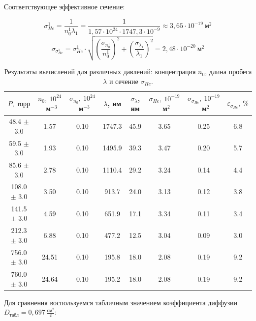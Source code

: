 \documentclass[a4paper,12pt]{article}
\begin{document}
\begin{enumerate}
Соответствующее эффективное сечение:

\begin{equation*}
    \sigma_{He}^1 = \frac{1}{n_0^1 \lambda_1} = \frac{1}{1{,}57 \cdot 10^{24} \cdot 1747{,}3 \cdot 10^{-9}} \approx 3{,}65 \cdot 10^{-19}~\text{м}^2
\end{equation*}
\begin{equation*}
    \sigma_{\sigma_{He}^1} = \sigma_{He}^1 \cdot \sqrt{\left(\frac{\sigma_{n_0^1}}{n_0^1}\right)^2 + \left(\frac{\sigma_{\lambda_1}}{\lambda_1}\right)^2} = 2{,}48 \cdot 10^{-20}~\text{м}^2
\end{equation*}

\end{enumerate}

\begin{table}[H]
    \centering
    \begin{tabular}{|c|c|c|c|c|c|c|c|}
        \hline
        $P,\ \text{торр}$ & $n_0,\ 10^{24}$~м$^{-3}$ & $\sigma_{n_0},\ 10^{24}$~м$^{-3}$ & $\lambda$, нм & $\sigma_\lambda$, нм & $\sigma_{He},\ 10^{-19}$~м$^2$ & $\sigma_{\sigma_{He}},\ 10^{-19}$~м$^2$ & $\varepsilon_{\sigma_{He}},\ \%$ \\
        \hline
        48.4 $\pm$ 3.0 & 1.57 & 0.10 & 1747.3 & 45.9 & 3.65 & 0.25 & 6.8 \\ \hline
        59.5 $\pm$ 3.0 & 1.93 & 0.10 & 1495.9 & 39.3 & 3.47 & 0.20 & 5.7 \\ \hline
        85.6 $\pm$ 3.0 & 2.78 & 0.10 & 1110.4 & 29.2 & 3.24 & 0.14 & 4.4 \\ \hline
        108.0 $\pm$ 3.0 & 3.50 & 0.10 & 913.7  & 24.0 & 3.13 & 0.12 & 3.8 \\ \hline
        141.5 $\pm$ 3.0 & 4.59 & 0.10 & 651.9  & 17.1 & 3.34 & 0.11 & 3.4 \\ \hline
        212.3 $\pm$ 3.0 & 6.88 & 0.10 & 477.2  & 12.5 & 3.04 & 0.09 & 3.0 \\ \hline
        756.0 $\pm$ 3.0 & 24.51 & 0.10 & 195.8  & 18.0 & 2.08 & 0.19 & 9.2 \\ \hline
        760.0 $\pm$ 3.0 & 24.64 & 0.10 & 195.2  & 18.0 & 2.08 & 0.19 & 9.2 \\
        \hline
    \end{tabular}
    \caption{Результаты вычислений для различных давлений: концентрация $n_0$, длина пробега $\lambda$ и сечение $\sigma_{He}$.}
\end{table}

Для сравнения воспользуемся табличным значением коэффициента диффузии $D_{\text{табл}} = 0{,}697~\frac{\text{см}^2}{\text{с}}$:
\end{document}
